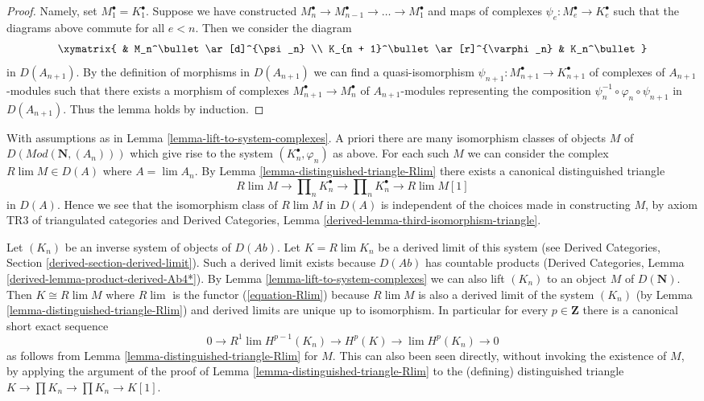 \begin{proof}
Namely, set $M_1^\bullet = K_1^\bullet$. Suppose
we have constructed
$M_n^\bullet \to M_{n - 1}^\bullet \to \ldots \to M_1^\bullet$
and maps of complexes $\psi_e : M_e^\bullet \to K_e^\bullet$ such that
the diagrams above commute for all $e < n$. Then we consider the diagram
$$
\xymatrix{
& M_n^\bullet \ar[d]^{\psi_n} \\
K_{n + 1}^\bullet \ar[r]^{\varphi_n} & K_n^\bullet
}
$$
in $D(A_{n + 1})$. By the definition of morphisms in $D(A_{n + 1})$ we can
find a quasi-isomorphism
$\psi_{n + 1} : M_{n + 1}^\bullet \to K_{n + 1}^\bullet$
of complexes of $A_{n + 1}$-modules such that there exists a morphism
of complexes $M_{n + 1}^\bullet \to M_n^\bullet$ of $A_{n + 1}$-modules
representing the composition 
$\psi_n^{-1} \circ \varphi_n \circ \psi_{n + 1}$ in $D(A_{n + 1})$.
Thus the lemma holds by induction.
\end{proof}

\begin{remark}
\label{remark-how-unique}
With assumptions as in Lemma \ref{lemma-lift-to-system-complexes}.
A priori there are many isomorphism classes of objects $M$ of
$D(\textit{Mod}(\mathbf{N}, (A_n)))$ which give rise to the system
$(K_n^\bullet, \varphi_n)$ as above. For each such $M$ we can consider the
complex $R\lim M \in D(A)$ where $A = \lim A_n$. By
Lemma \ref{lemma-distinguished-triangle-Rlim}
there exists a canonical distinguished triangle
$$
R\lim M \to \prod\nolimits_n K_n^\bullet \to \prod\nolimits_n K_n^\bullet
\to R\lim M[1]
$$
in $D(A)$. Hence we see that the isomorphism class of $R\lim M$ in
$D(A)$ is independent of the choices made in constructing $M$, by
axiom TR3 of triangulated categories and
Derived Categories, Lemma \ref{derived-lemma-third-isomorphism-triangle}.
\end{remark}

\begin{remark}
\label{remark-compare-derived-limit}
Let $(K_n)$ be an inverse system of objects of $D(\textit{Ab})$.
Let $K = R\lim K_n$ be a derived limit of this system (see
Derived Categories, Section \ref{derived-section-derived-limit}). Such
a derived limit exists because $D(\textit{Ab})$ has countable products
(Derived Categories, Lemma \ref{derived-lemma-product-derived-Ab4*}).
By Lemma \ref{lemma-lift-to-system-complexes} we can also lift
$(K_n)$ to an object $M$ of $D(\mathbf{N})$.
Then $K \cong R\lim M$ where $R\lim$ is the functor (\ref{equation-Rlim})
because $R\lim M$ is also a derived limit of the system $(K_n)$
(by Lemma \ref{lemma-distinguished-triangle-Rlim})
and derived limits are unique up to isomorphism. In particular
for every $p \in \mathbf{Z}$ there is a canonical short exact sequence
$$
0 \to R^1\lim H^{p - 1}(K_n) \to H^p(K) \to \lim H^p(K_n) \to 0
$$
as follows from Lemma \ref{lemma-distinguished-triangle-Rlim} for $M$.
This can also been seen directly, without invoking the existence of $M$,
by applying the argument of the proof of
Lemma \ref{lemma-distinguished-triangle-Rlim} to the (defining)
distinguished triangle $K \to \prod K_n \to \prod K_n \to K[1]$.
\end{remark}

